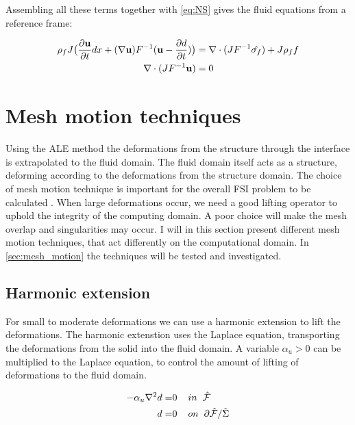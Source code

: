 Assembling all these terms together with \eqref{eq:NS} gives the fluid equations from a reference frame:

\begin{align}
\label{eq:NS_mapped}
\rho_f J \big( \frac{\partial \bold{u}}{\partial t} dx + (\nabla \bold{u})F^{-1}(\bold{u}-\frac{\partial d}{\partial t}) \big) &= \nabla \cdot( J F^{-1} \hat{\sigma_f} ) + J \rho_f f \\
\nabla \cdot (J F^{-1} \bold{u} ) &= 0
\end{align} 

\section{Mesh motion techniques} \label{sec:meshmotion}
Using the ALE method the deformations from the structure through the interface is extrapolated to the fluid domain. The fluid domain itself acts as a structure, deforming according to the deformations from the structure domain.
The choice of mesh motion technique is important for the overall FSI problem to be calculated \cite{Wick2011a}. When large deformations occur, we need a good lifting operator to uphold the integrity of the computing domain. A poor choice will make the mesh overlap and singularities may occur. I will in this section present different mesh motion techniques, that act differently on the computational domain. In \ref{sec:mesh_motion} the techniques will be tested and investigated.

\subsection{Harmonic extension}
For small to moderate deformations we can use a harmonic extension to lift the deformations. The harmonic extenstion uses the Laplace equation, transporting the deformations from the solid into the fluid domain. A variable $\alpha_u > 0$ can be multiplied to the Laplace equation, to control the amount of lifting of deformations to the fluid domain.

\begin{align}
 - \alpha_u \nabla^2 d =& 0\hspace{4mm} in \hspace{2mm} \hat{\mathcal{F}}\\
  \hspace{4mm} d =& 0 \hspace{4mm } on \hspace{2mm }  \partial \hat{\mathcal{F}} / \hat{\Sigma}
\end{align}


